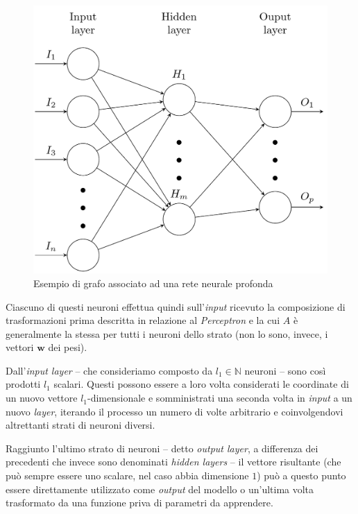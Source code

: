 \documentclass[a4paper, twoside]{article}
\begin{document}
\begin{figure}
	\includegraphics[width=0.94\linewidth]{nnet-graph.png}
	\captionsetup{labelformat=empty}
	\caption{Esempio di grafo associato ad una rete neurale profonda}
\end{figure}

Ciascuno di questi neuroni effettua quindi sull'\textit{input} ricevuto la composizione di trasformazioni prima descritta in relazione al \textit{Perceptron} e la cui $A$ è generalmente la stessa per tutti i neuroni dello strato (non lo sono, invece, i vettori $\boldsymbol{w}$ dei pesi).

Dall'\textit{input layer} -- che consideriamo composto da $l_1 \in \mathbb{N}$ neuroni -- sono così prodotti $l_1$ scalari. Questi possono essere a loro volta considerati le coordinate di un nuovo vettore $l_1$-dimensionale e somministrati una seconda volta in \textit{input} a un nuovo \textit{layer}, iterando il processo un numero di volte arbitrario e coinvolgendovi altrettanti strati di neuroni diversi.

Raggiunto l'ultimo strato di neuroni -- detto \textit{output layer}, a differenza dei precedenti che invece sono denominati \textit{hidden layers} -- il vettore risultante (che può sempre essere uno scalare, nel caso abbia dimensione $1$) può a questo punto essere direttamente utilizzato come \textit{output} del modello o un'ultima volta trasformato da una funzione priva di parametri da apprendere.
\end{document}
